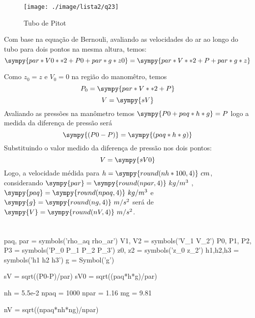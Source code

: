 \documentclass[a4paper,twocolumn,11pt]{article}
\newcommand{\npy}[1]{\sympy{round(n#1,4)}}
\newcommand{\nnpy}[1]{\sympy{#1} = \sympy{round(n#1,4)}}
\begin{document}
\begin{figure}[H]
\centering
\label{fig:l2q23}
\texttt{[image: ./image/lista2/q23]}
\caption{Tubo de Pitot}
\end{figure}
Com base na equação de Bernouli, avaliando as velocidades do ar ao longo do tubo para dois pontos na mesma altura, temos:
$$
\sympy{par*V0**2 +P0 + par*g*z0} = \sympy{par*V**2 +P + par*g*z}
$$

Como $z_0=z$ e $V_0=0$ na região do manomêtro, temos
$$
P_0 = \sympy{par*V**2 + P}
$$
\begin{equation}
V=\sympy{sV}
\end{equation}
Avaliando as pressões na manômetro temos $ \sympy{P0 + paq*h*g} = P$ logo a medida da diferença de pressão será
\begin{equation}
\sympy{(P0 - P)} = \sympy{(paq*h*g)}
\end{equation}
Substituindo o valor medido da diferença de pressão nos dois pontos:
\begin{equation}
V= \sympy{sV0}
\end{equation}
Logo, a velocidade médida para $h = \npy{h*100}\ cm$, considerando $\nnpy{par}\ kg/m^3$ , $\nnpy{paq}\ kg/m^3$ e $\nnpy{g}\ m/s^2$ será de $\nnpy{V}\ m/s^2$.

\section{} %
\begin{sympycode}
paq, par = symbols('rho_aq rho_ar')
V1, V2 = symbols('V_1 V_2')
P0, P1, P2, P3 = symbols('P_0 P_1 P_2 P_3')
z0, z2 = symbols('z_0 z_2')
h1,h2,h3 = symbols('h1 h2 h3')
g = Symbol('g')

sV = sqrt((P0-P)/par)
sV0 = sqrt((paq*h*g)/par)

nh = 5.5e-2
npaq = 1000
npar = 1.16
mg = 9.81

nV = sqrt((npaq*nh*ng)/npar)
\end{sympycode}
\end{document}
